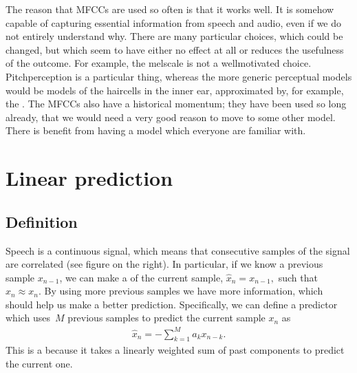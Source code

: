 \documentclass[letterpaper,10pt,english]{jupyterBook}
\begin{document}
\sphinxAtStartPar
The reason that MFCCs are used so often is that it works well. It is somehow capable of capturing essential information from speech and audio, even if we do not entirely understand why. There are many particular choices, which could be changed, but which seem to have either no effect at all or reduces the usefulness of the outcome. For example, the mel\sphinxhyphen{}scale is not a well\sphinxhyphen{}motivated choice. Pitch\sphinxhyphen{}perception is a particular thing, whereas the more generic perceptual models would be models of the hair\sphinxhyphen{}cells in the inner ear, approximated by, for example, the . The MFCCs also have a historical momentum; they have been used so long already, that we would need a very good reason to move to some other model. There is benefit from having a model which everyone are familiar with.

\sphinxstepscope


\section{Linear prediction}
\label{\detokenize{Representations/Linear_prediction:linear-prediction}}\label{\detokenize{Representations/Linear_prediction::doc}}

\subsection{Definition}
\label{\detokenize{Representations/Linear_prediction:definition}}
\sphinxAtStartPar
Speech is a continuous signal, which means that consecutive samples of
the signal are correlated (see figure on the right). In particular, if
we know a previous sample \(x_{n-1}\), we can make a 
of the current sample, \( \hat x_n = x_{n-1}, \) such that \( \hat
x_n \approx x_n. \) By using more previous samples we have more
information, which should help us make a better prediction.
Specifically, we can define a predictor which uses \(M\) previous samples
to predict the current sample \(x_{n }\) as
\begin{equation*}
\begin{split} \hat x_n = - \sum_{k=1}^M a_k x_{n-k}. \end{split}
\end{equation*}
\sphinxAtStartPar
This is a  because it takes a linearly weighted sum of
past components to predict the current one.
\end{document}
